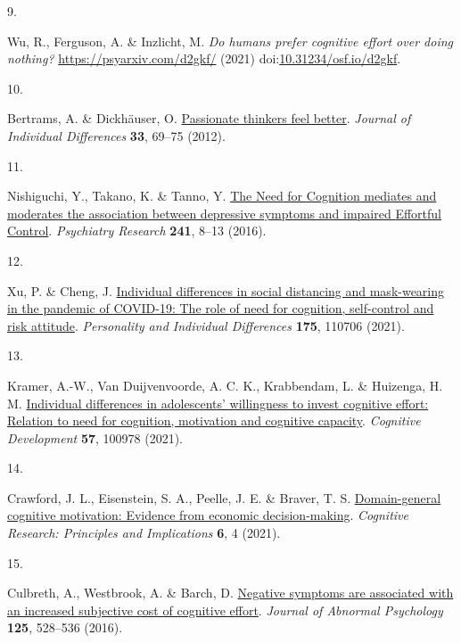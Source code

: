 \documentclass[
  man,floatsintext]{apa6}
\newlength{\cslhangindent}
\newlength{\csllabelwidth}
\newlength{\cslentryspacingunit} %
\newenvironment{CSLReferences}[2] %
 {%
  \setlength{\parindent}{0pt}
  \ifodd #1
  \let\oldpar\par
  \def\par{\hangindent=\cslhangindent\oldpar}
  \fi
  \setlength{\parskip}{#2\cslentryspacingunit}
 }%
 {}
\newcommand{\CSLLeftMargin}[1]{\parbox[t]{\csllabelwidth}{#1}}
\newcommand{\CSLRightInline}[1]{\parbox[t]{\linewidth - \csllabelwidth}{#1}\break}
\begin{document}
\begin{CSLReferences}{0}{0}
\leavevmode{}%
\CSLLeftMargin{9. }%
\CSLRightInline{Wu, R., Ferguson, A. \& Inzlicht, M. \emph{Do humans prefer cognitive effort over doing nothing?} \url{https://psyarxiv.com/d2gkf/} (2021) doi:\href{https://doi.org/10.31234/osf.io/d2gkf}{10.31234/osf.io/d2gkf}.}

\leavevmode{}%
\CSLLeftMargin{10. }%
\CSLRightInline{Bertrams, A. \& Dickhäuser, O. \href{https://doi.org/10.1027/1614-0001/a000081}{Passionate thinkers feel better}. \emph{Journal of Individual Differences} \textbf{33}, 69--75 (2012).}

\leavevmode{}%
\CSLLeftMargin{11. }%
\CSLRightInline{Nishiguchi, Y., Takano, K. \& Tanno, Y. \href{https://doi.org/10.1016/j.psychres.2016.04.092}{The {Need} for {Cognition} mediates and moderates the association between depressive symptoms and impaired {Effortful} {Control}}. \emph{Psychiatry Research} \textbf{241}, 8--13 (2016).}

\leavevmode{}%
\CSLLeftMargin{12. }%
\CSLRightInline{Xu, P. \& Cheng, J. \href{https://doi.org/10.1016/j.paid.2021.110706}{Individual differences in social distancing and mask-wearing in the pandemic of {COVID}-19: {The} role of need for cognition, self-control and risk attitude}. \emph{Personality and Individual Differences} \textbf{175}, 110706 (2021).}

\leavevmode{}%
\CSLLeftMargin{13. }%
\CSLRightInline{Kramer, A.-W., Van Duijvenvoorde, A. C. K., Krabbendam, L. \& Huizenga, H. M. \href{https://doi.org/10.1016/j.cogdev.2020.100978}{Individual differences in adolescents' willingness to invest cognitive effort: {Relation} to need for cognition, motivation and cognitive capacity}. \emph{Cognitive Development} \textbf{57}, 100978 (2021).}

\leavevmode{}%
\CSLLeftMargin{14. }%
\CSLRightInline{Crawford, J. L., Eisenstein, S. A., Peelle, J. E. \& Braver, T. S. \href{https://doi.org/10.1186/s41235-021-00272-7}{Domain-general cognitive motivation: Evidence from economic decision-making}. \emph{Cognitive Research: Principles and Implications} \textbf{6}, 4 (2021).}

\leavevmode{}%
\CSLLeftMargin{15. }%
\CSLRightInline{Culbreth, A., Westbrook, A. \& Barch, D. \href{https://doi.org/10.1037/abn0000153}{Negative symptoms are associated with an increased subjective cost of cognitive effort}. \emph{Journal of Abnormal Psychology} \textbf{125}, 528--536 (2016).}


\end{CSLReferences}
\end{document}
